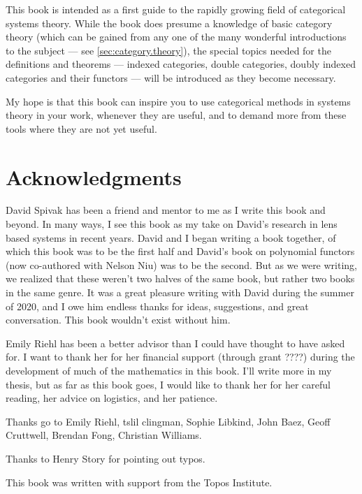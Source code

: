 \documentclass[DynamicalBook]{subfiles}
\begin{document}
This book is intended as a first guide to the rapidly growing field of categorical systems theory. While the book does presume a knowledge of basic category theory (which can be gained from any one of the many wonderful introductions to the subject --- see \cref{sec:category.theory}), the special topics needed for the definitions and theorems --- indexed categories, double categories, doubly indexed categories and their functors --- will be introduced as they become necessary.

My hope is that this book can inspire you to use categorical methods in systems theory in your work, whenever they are useful, and to demand more from these tools where they are not yet useful.







\section*{Acknowledgments}

David Spivak has been a friend and mentor to me as I write this book and beyond.
In many ways, I see this book as my take on David's research in lens based
systems in recent years. David and I began writing a book together, of which
this book was to be the first half and David's book on polynomial functors (now
co-authored with Nelson Niu) was to be the second. But as we were writing, we
realized that these weren't two halves of the same book, but rather two books
in the same genre. It was a great pleasure writing with David during the summer
of 2020, and I owe him endless thanks for ideas, suggestions, and great
conversation. This book wouldn't exist without him.

Emily Riehl has been a better advisor than I could have thought to have asked for. I want to thank her for her financial support (through grant ????) during the development of much of the mathematics in this book. I'll write more in my thesis, but as far as this book goes, I would like to thank her for her careful reading, her advice on logistics, and her patience.

Thanks go to Emily Riehl, tslil clingman, Sophie Libkind, John Baez, Geoff Cruttwell, Brendan
Fong, Christian Williams.

Thanks to Henry Story for pointing out typos.

This book was written with support from the Topos Institute.
\end{document}
